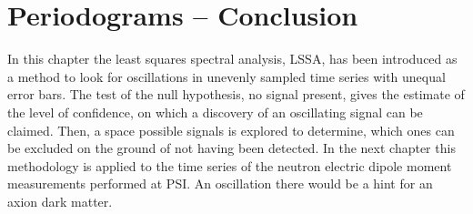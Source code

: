 \section*{Periodograms -- Conclusion}
In this chapter the least squares spectral analysis, LSSA, has been introduced as a method to look for oscillations in unevenly sampled time series with unequal error bars. The test of the null hypothesis, no signal present, gives the estimate of the level of confidence, on which a discovery of an oscillating signal can be claimed. Then, a space possible signals is explored to determine, which ones can be excluded on the ground of not having been detected. In the next chapter this methodology is applied to the time series of the neutron electric dipole moment measurements performed at PSI\@. An oscillation there would be a hint for an axion dark matter.
